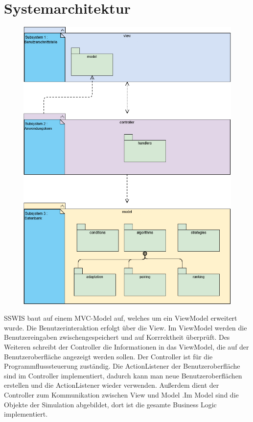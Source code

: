\section{Systemarchitektur}

\begin{figure} 
  \centering
     \includegraphics[width=1.1\textwidth]{Systemarchitektur/UMLzuGrobentwurf.png}
\end{figure}

SSWIS baut auf einem MVC-Model auf, welches um ein ViewModel erweitert wurde. Die Benutzerinteraktion erfolgt
über die View. Im ViewModel werden die Benutzereingaben zwischengespeichert und auf Korrrektheit überprüft. Des Weiteren schreibt der Controller die Informationen in das ViewModel, die auf der Benutzeroberfläche angezeigt werden sollen. Der Controller ist für die Programmflusssteuerung zuständig. Die ActionListener der Benutzeroberfläche sind im Controller implementiert, dadurch kann man neue Benutzeroberflächen erstellen und die ActionListener wieder verwenden. Außerdem dient der Controller zum Kommunikation zwischen View und Model .Im Model sind die Objekte der Simulation abgebildet, dort ist die gesamte Business Logic implementiert.
